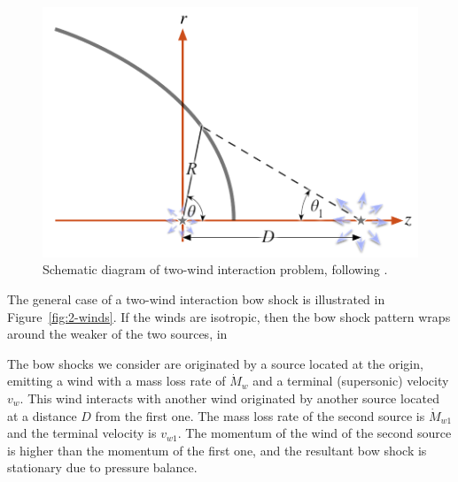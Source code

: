 \begin{figure}
  \centering
  \includegraphics[width=\linewidth]{figs/bowshock-crw-variables}
  \caption[]{Schematic diagram of two-wind interaction problem,
    following \citet{Canto:1996}.}
  \label{fig:crw-schema}
\end{figure}

The general case of a two-wind interaction bow shock is illustrated in
Figure~\ref{fig:2-winds}.  If the winds are isotropic, then the bow
shock pattern wraps around the weaker of the two sources, in

The bow shocks we consider are originated by a source located at the
origin, emitting a wind with a mass loss rate of $\dot{M}_w$ and a
terminal (supersonic) velocity $v_w$. This wind interacts with another
wind originated by another source located at a distance $D$ from the
first one.  The mass loss rate of the second source is $\dot{M}_{w1}$
and the terminal velocity is $v_{w1}$. The momentum of the wind of the
second source is higher than the momentum of the first one, and the
resultant bow shock is stationary due to pressure balance.

